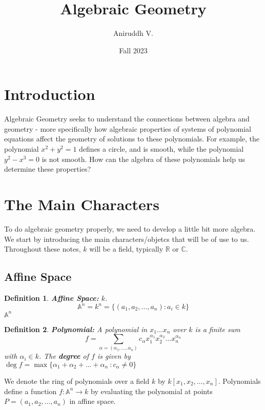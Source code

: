 \documentclass{article}
\title{Algebraic Geometry}
\author{Aniruddh V.}
\date{Fall 2023}
\newtheorem{definition}{Definition}[section]
\begin{document}
\maketitle

\section{Introduction} Algebraic Geometry seeks to understand the connections between algebra and geometry - more specifically how algebraic properties of systems of polynomial equations affect
the geometry of solutions to these polynomials. For example, the polynomial $x^2 + y^2 = 1$ defines a circle, and is smooth, while the polynomial $y^2 - x^3 = 0$ is not smooth. How can the 
algebra of these polynomials help us determine these properties? \\

\section{The Main Characters}
To do algebraic geometry properly, we need to develop a little bit more algebra. We start by introducing the main characters/objetcs that will be of use to us. Throughout these notes, 
$k$ will be a field, typically $\mathbb{R}$ or \(\mathbb{C}\). 


\subsection{Affine Space}
\begin{definition}
    \textbf{Affine Space:}  \(k\).  \[ \mathbb{A}^n = k^n = \{ (a_1, a_2, \ldots, a_n) : a_i \in k \} \]  \( \mathbb{A}^n \)
\end{definition}

\begin{definition}
    \textbf{Polynomial:} A polynomial in $x_1 \ldots x_n$ over $k$ is a finite sum \[ f = \sum_{\alpha = (\alpha_1, \ldots , \alpha_n )} c_\alpha x_1 ^{\alpha_1} x_2^{\alpha_2} \ldots x_n ^{\alpha_n} \] with \(\alpha_i \in k\). 
    The \textbf{degree} of $f$ is given by \( \deg f = \max \{\alpha_1 + \alpha_2 + \ldots + \alpha_n\ : c_\alpha \neq 0 \}\)

\end{definition}

We denote the ring of polynomials over a  field $k$ by $k[x_1, x_2, \ldots, x_n]$. Polynomials define a function $f: \mathbb{A}^n \to k$ by evaluating the polynomial at points \( P = (a_1, a_2, \ldots, a_n)\)
in affine space. \\
\end{document}
